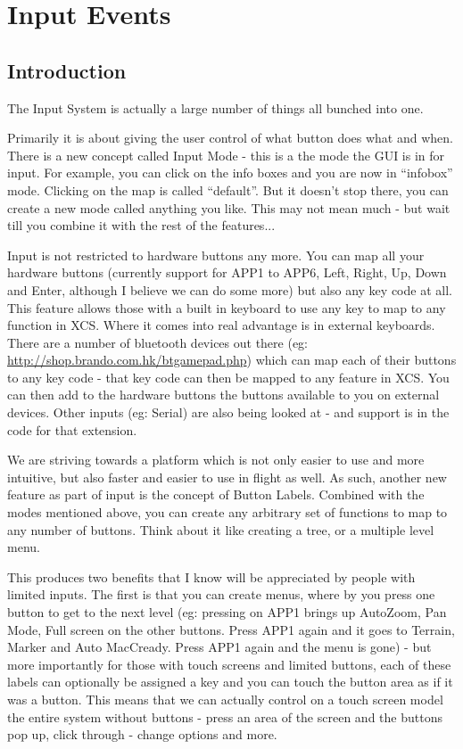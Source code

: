 \section{Input Events}

\subsection{Introduction}

The Input System is actually a large number of things all bunched into one.

Primarily it is about giving the user control of what button does what
and when. There is a new concept called Input Mode - this is a the
mode the GUI is in for input. For example, you can click on the info
boxes and you are now in ``infobox'' mode. Clicking on the map is called
``default''. But it doesn't stop there, you can create a new mode called
anything you like. This may not mean much - but wait till you combine
it with the rest of the features...

Input is not restricted to hardware buttons any more. You can map all
your hardware buttons (currently support for APP1 to APP6, Left,
Right, Up, Down and Enter, although I believe we can do some more) but
also any key code at all. This feature allows those with a built in
keyboard to use any key to map to any function in XCS. Where it comes
into real advantage is in external keyboards. There are a number of
bluetooth devices out there (eg: \url{http://shop.brando.com.hk/btgamepad.php}) 
which can map each of their
buttons to any key code - that key code can then be mapped to any
feature in XCS. You can then add to the hardware buttons the buttons
available to you on external devices. Other inputs (eg: Serial) are
also being looked at - and support is in the code for that extension.

We are striving towards a platform which is not only easier to use and
more intuitive, but also faster and easier to use in flight as
well. As such, another new feature as part of input is the concept of
Button Labels. Combined with the modes mentioned above, you can create
any arbitrary set of functions to map to any number of buttons. Think
about it like creating a tree, or a multiple level menu.

This produces two benefits that I know will be appreciated by people
with limited inputs. The first is that you can create menus, where by
you press one button to get to the next level (eg: pressing on APP1
brings up AutoZoom, Pan Mode, Full screen on the other buttons. Press
APP1 again and it goes to Terrain, Marker and Auto MacCready. Press
APP1 again and the menu is gone) - but more importantly for those with
touch screens and limited buttons, each of these labels can optionally
be assigned a key and you can touch the button area as if it was a
button.  This means that we can actually control on a touch screen
model the entire system without buttons - press an area of the screen
and the buttons pop up, click through - change options and more.

